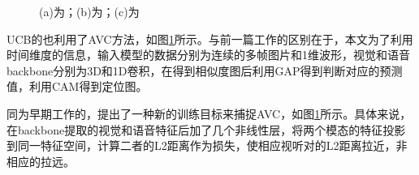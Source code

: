 \documentclass[12pt]{article}
\begin{document}
\begin{figure}[!h]
{\begin{minipage}[t]{0.15\linewidth}
  \end{minipage}%
  }%
  \centering
  \caption{(a)为\cite{object}；(b)为\cite{ucb}；(c)为\cite{6}}
  \label{ref1}
\end{figure}

UCB的\cite{ucb}也利用了AVC方法，如图\ref{ref1}所示。与前一篇工作的区别在于，本文为了利用时间维度的信息，输入模型的数据分别为连续的多帧图片和1维波形，视觉和语音backbone分别为3D和1D卷积，在得到相似度图后利用GAP得到判断对应的预测值，利用CAM得到定位图。

同为早期工作的\cite{6}，提出了一种新的训练目标来捕捉AVC，如图\ref{ref1}所示。具体来说，在backbone提取的视觉和语音特征后加了几个非线性层，将两个模态的特征投影到同一特征空间，计算二者的L2距离作为损失，使相应视听对的L2距离拉近，非相应的拉远。
\end{document}
